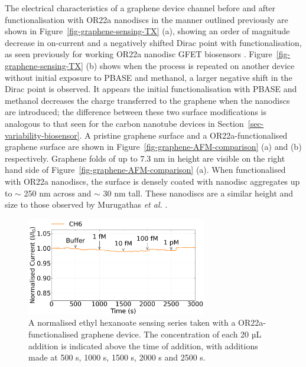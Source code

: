 \documentclass[
  a4paper,
]{scrbook}
\begin{document}
The electrical characteristics of a graphene device channel before and
after functionalisation with OR22a nanodiscs in the manner outlined
previously are shown in Figure~\ref{fig-graphene-sensing-TX} (a),
showing an order of magnitude decrease in on-current and a negatively
shifted Dirac point with functionalisation, as seen previously for
working OR22a nanodisc GFET biosensors \autocite{Murugathas2020}.
Figure~\ref{fig-graphene-sensing-TX} (b) shows when the process is
repeated on another device without initial exposure to PBASE and
methanol, a larger negative shift in the Dirac point is observed. It
appears the initial functionalisation with PBASE and methanol decreases
the charge transferred to the graphene when the nanodiscs are
introduced; the difference between these two surface modifications is
analogous to that seen for the carbon nanotube devices in
Section~\ref{sec-variability-biosensor}. A pristine graphene surface and
a OR22a-functionalised graphene surface are shown in
Figure~\ref{fig-graphene-AFM-comparison} (a) and (b) respectively.
Graphene folds of up to 7.3 nm in height are visible on the right hand
side of Figure~\ref{fig-graphene-AFM-comparison} (a). When
functionalised with OR22a nanodiscs, the surface is densely coated with
nanodisc aggregates up to \(\sim\) 250 nm across and \(\sim\) 30 nm
tall. These nanodiscs are a similar height and size to those observed by
Murugathas \emph{et al.} \autocite{Murugathas2020}.

\begin{figure}

{\centering \includegraphics[width=0.7\textwidth,height=\textheight]{figures/ch8/Q3C3_filtered_trunc_arrows_normalised.png}

}

\caption{\label{fig-graphene-sensing}A normalised ethyl hexanoate
sensing series taken with a OR22a-functionalised graphene device. The
concentration of each 20 µL addition is indicated above the time of
addition, with additions made at 500 s, 1000 s, 1500 s, 2000 s and 2500
s.}

\end{figure}
\end{document}

